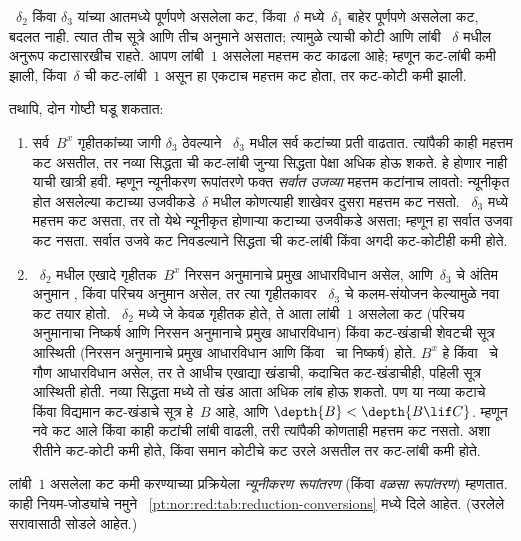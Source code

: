 ~$\delta_2$ किंवा
$\delta_3$ यांच्या
आतमध्ये पूर्णपणे असलेला
कट, किंवा~$\delta$
मध्ये~$\delta_1$
बाहेर पूर्णपणे असलेला
कट, बदलत नाही.
त्यात तीच सूत्रे
आणि तीच अनुमाने
असतात; त्यामुळे त्याची
कोटी आणि लांबी
~$\delta$ मधील
अनुरूप कटासारखीच
राहते. आपण लांबी~$1$
असलेला महत्तम कट
काढला आहे; म्हणून
कट-लांबी कमी झाली,
किंवा~$\delta$
ची कट-लांबी~$1$
असून हा एकटाच महत्तम
कट होता, तर कट-कोटी
कमी झाली.

तथापि, दोन गोष्टी
घडू शकतात:
\begin{enumerate}
  \item सर्व~$B^x$
  गृहीतकांच्या जागी
  $\delta_3$ ठेवल्याने
  ~$\delta_3$ मधील
  सर्व कटांच्या प्रती
  वाढतात. त्यांपैकी
  काही महत्तम कट
  असतील, तर नव्या
  सिद्धता ची कट-लांबी
  जुन्या सिद्धता
  पेक्षा अधिक होऊ
  शकते. हे होणार
  नाही याची खात्री
  हवी. म्हणून न्यूनीकरण
  रूपांतरणे फक्त
  \emph{सर्वात उजव्या}
  महत्तम कटांनाच
  लावतो: न्यूनीकृत
  होत असलेल्या कटाच्या
  उजवीकडे~$\delta$
  मधील कोणत्याही
  शाखेवर दुसरा महत्तम
  कट नसतो. ~$\delta_3$
  मध्ये महत्तम कट असता, तर
  तो येथे न्यूनीकृत
  होणाऱ्या कटाच्या
  उजवीकडे असता;
  म्हणून हा सर्वात
  उजवा कट नसता.
  सर्वात उजवे कट
  निवडल्याने सिद्धता
  ची कट-लांबी किंवा
  अगदी कट-कोटीही
  कमी होते.
  \item ~$\delta_2$
  मधील एखादे गृहीतक~$B^x$
  निरसन अनुमानाचे
  प्रमुख आधारविधान
  असेल, आणि~$\delta_3$
  चे अंतिम अनुमान
  \Elim{\lor}, \Elim{\lexists}
  किंवा परिचय
  अनुमान असेल, तर
  त्या गृहीतकावर
  ~$\delta_3$ चे
  कलम-संयोजन केल्यामुळे
  नवा कट तयार होतो.
  ~$\delta_2$ मध्ये
  जे केवळ गृहीतक
  होते, ते आता लांबी~$1$
  असलेला कट
  (परिचय
  अनुमानाचा निष्कर्ष आणि
  निरसन अनुमानाचे
  प्रमुख आधारविधान)
  किंवा कट-खंडाची
  शेवटची सूत्र
  आस्थिती
  (निरसन
  अनुमानाचे प्रमुख
  आधारविधान आणि
  \Elim{\lor}
  किंवा~\Elim{\lexists}
  चा निष्कर्ष)
  होते. $B^x$ हे
  \Elim{\lor}
  किंवा~\Elim{\lexists}
  चे गौण आधारविधान
  असेल, तर ते आधीच
  एखाद्या खंडाची,
  कदाचित कट-खंडाचीही,
  पहिली सूत्र
  आस्थिती होती.
  नव्या सिद्धता
  मध्ये तो खंड
  आता अधिक लांब
  होऊ शकतो. पण
  या नव्या कटाचे
  किंवा विद्यमान
  कट-खंडाचे सूत्र
  हे~$B$ आहे, आणि
  $\depth{B} < \depth{B \lif C}$.
  म्हणून नवे कट
  आले किंवा काही
  कटांची लांबी
  वाढली, तरी त्यांपैकी
  कोणताही महत्तम कट
  नसतो. अशा रीतीने
  कट-कोटी कमी होते,
  किंवा समान कोटीचे
  कट उरले असतील
  तर कट-लांबी कमी
  होते.
\end{enumerate}

लांबी~$1$ असलेला
कट कमी करण्याच्या
प्रक्रियेला
\emph{न्यूनीकरण रूपांतरण}
(किंवा
\emph{वळसा रूपांतरण})
म्हणतात. काही
नियम-जोड्यांचे नमुने
~\ref{pt:nor:red:tab:reduction-conversions}
मध्ये दिले आहेत.
(उरलेले सरावासाठी
सोडले आहेत.)

